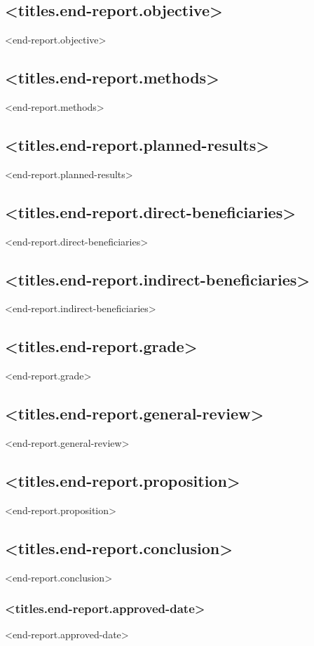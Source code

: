 \documentclass[twoside,a4paper]{article}
\begin{document}
		\subsection*{<titles.end-report.objective>}
		    <end-report.objective>
		    
		\subsection*{<titles.end-report.methods>}
		    <end-report.methods>
		    
		\subsection*{<titles.end-report.planned-results>}
		    <end-report.planned-results>
		
		\subsection*{<titles.end-report.direct-beneficiaries>}
		    <end-report.direct-beneficiaries>
		
		\subsection*{<titles.end-report.indirect-beneficiaries>}
		    <end-report.indirect-beneficiaries>
		
		\subsection*{<titles.end-report.grade>}
		    <end-report.grade>
		
		\subsection*{<titles.end-report.general-review>}
		    <end-report.general-review>
	
	    \subsection*{<titles.end-report.proposition>}
		<end-report.proposition>
		
	    \subsection*{<titles.end-report.conclusion>}		
		<end-report.conclusion>
		
		\subsubsection*{<titles.end-report.approved-date>}
		<end-report.approved-date>
	
\end{document}

